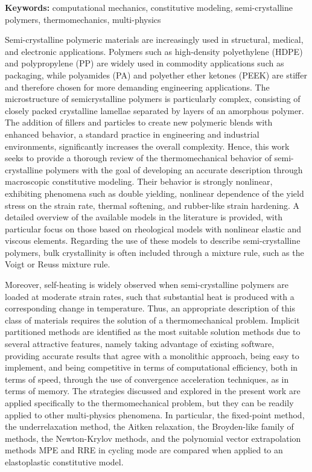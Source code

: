 \documentclass[a4paper, openright, twoside]{report}
\newcounter{problem}[chapter]\setcounter{problem}{1}
\begin{document}
\textbf{Keywords:} computational mechanics, constitutive modeling, semi-crystalline polymers, thermomechanics, multi-physics
\smallskip

Semi-crystalline polymeric materials are increasingly used in structural, medical, and electronic applications.
Polymers such as high-density polyethylene (HDPE) and polypropylene (PP) are widely used in commodity applications such as packaging, while polyamides (PA) and polyether ether ketones (PEEK) are stiffer and therefore chosen for more demanding engineering applications.
The microstructure of semicrystalline polymers is particularly complex, consisting of closely packed crystalline lamellae separated by layers of an amorphous polymer.
The addition of fillers and particles to create new polymeric blends with enhanced behavior, a standard practice in engineering and industrial environments, significantly increases the overall complexity.
Hence, this work seeks to provide a thorough review of the thermomechanical behavior of semi-crystalline polymers with the goal of developing an accurate description through macroscopic constitutive modeling.
Their behavior is strongly nonlinear, exhibiting phenomena such as double yielding, nonlinear dependence of the yield stress on the strain rate, thermal softening, and rubber-like strain hardening.
A detailed overview of the available models in the literature is provided, with particular focus on those based on rheological models with nonlinear elastic and viscous elements.
Regarding the use of these models to describe semi-crystalline polymers, bulk crystallinity is often included through a mixture rule, such as the Voigt or Reuss mixture rule.

Moreover, self-heating is widely observed when semi-crystalline polymers are loaded at moderate strain rates, such that substantial heat is produced with a corresponding change in temperature.
Thus, an appropriate description of this class of materials requires the solution of a thermomechanical problem.
Implicit partitioned methods are identified as the most suitable solution methods due to several attractive features, namely taking advantage of existing software, providing accurate results that agree with a monolithic approach, being easy to implement, and being competitive in terms of computational efficiency, both in terms of speed, through the use of convergence acceleration techniques, as in terms of memory.
The strategies discussed and explored in the present work are applied specifically to the thermomechanical problem, but they can be readily applied to other multi-physics phenomena.
In particular, the fixed-point method, the underrelaxation method, the Aitken relaxation, the Broyden-like family of methods, the Newton-Krylov methods, and the polynomial vector extrapolation methods MPE and RRE in cycling mode are compared when applied to an elastoplastic constitutive model.
\end{document}
